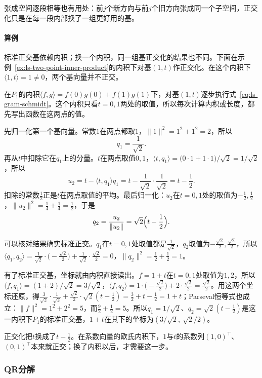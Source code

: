 张成空间逐段相等也有用处：前$j$个新方向与前$j$个旧方向张成同一个子空间，正交化只是在每一段内部换了一组更好用的基。

\paragraph{算例}
标准正交基依赖内积；换一个内积，同一组基正交化的结果也不同。下面在示例~\ref{ex:ls-two-point-inner-product}的内积下对基$(1,t)$作正交化。在这个内积下$\langle1,t\rangle=1\neq0$，两个基向量并不正交。
\begin{example}
\label{ex:ls-gram-schmidt-two-point}
在$P_1$的内积$\langle f,g\rangle=f(0)g(0)+f(1)g(1)$下，对基$(1,t)$逐步执行式~\eqref{eq:ls-gram-schmidt}。这个内积只看$t=0,1$两处的取值，所以每次计算内积或长度，都先写出函数在这两点的值。

先归一化第一个基向量。常数$1$在两点都取$1$，$\lVert1\rVert^2=1^2+1^2=2$，所以
\[
 q_1=\frac1{\sqrt2}.
\]
再从$t$中扣除它在$q_1$上的分量。$t$在两点取值$0,1$，$\langle t,q_1\rangle=\bigl(0\cdot1+1\cdot1\bigr)/\sqrt2=1/\sqrt2$，所以
\[
 u_2=t-\langle t,q_1\rangle q_1=t-\frac1{\sqrt2}\cdot\frac1{\sqrt2}=t-\frac12.
\]
扣除的常数$\tfrac12$正是$t$在两点取值的平均。最后归一化：$u_2$在$t=0,1$处的取值为$-\tfrac12,\tfrac12$，$\lVert u_2\rVert^2=\tfrac14+\tfrac14=\tfrac12$，于是
\[
 q_2=\frac{u_2}{\lVert u_2\rVert}=\sqrt2\Bigl(t-\frac12\Bigr).
\]

可以核对结果确实标准正交。$q_1$在$t=0,1$处取值都是$\tfrac1{\sqrt2}$，$q_2$取值为$-\tfrac{\sqrt2}2,\tfrac{\sqrt2}2$，所以$\langle q_1,q_2\rangle=\tfrac1{\sqrt2}\cdot\bigl(-\tfrac{\sqrt2}2\bigr)+\tfrac1{\sqrt2}\cdot\tfrac{\sqrt2}2=0$，$\lVert q_2\rVert^2=\tfrac12+\tfrac12=1$。

有了标准正交基，坐标就由内积直接读出。$f=1+t$在$t=0,1$处取值为$1,2$，所以$\langle f,q_1\rangle=(1+2)/\sqrt2=3/\sqrt2$，$\langle f,q_2\rangle=1\cdot\bigl(-\tfrac{\sqrt2}2\bigr)+2\cdot\tfrac{\sqrt2}2=\tfrac{\sqrt2}2$。用这两个坐标还原，得$\tfrac3{\sqrt2}\cdot\tfrac1{\sqrt2}+\tfrac{\sqrt2}2\cdot\sqrt2(t-\tfrac12)=\tfrac32+t-\tfrac12=1+t$；Parseval恒等式也成立：$\lVert f\rVert^2=1^2+2^2=5$，而$\tfrac92+\tfrac12=5$。所以$q_1=1/\sqrt2$、$q_2=\sqrt2(t-\tfrac12)$是这一内积下$P_1$的标准正交基，$1+t$在其下的坐标为$(3/\sqrt2,\ \sqrt2/2)$。
\end{example}
正交化把$t$换成了$t-\tfrac12$。在系数向量的欧氏内积下，$1$与$t$的系数列$(1,0)^\top$、$(0,1)^\top$本来就正交；换了内积以后，才需要这一步。

\subsubsection{QR分解}

